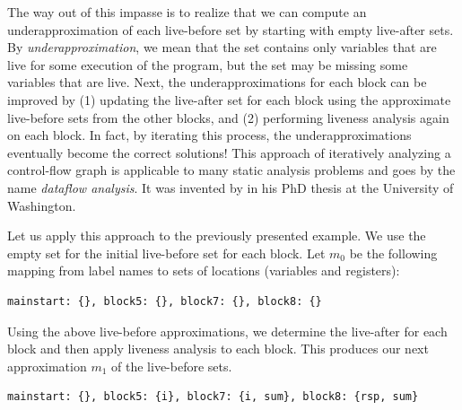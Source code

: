 \documentclass[7x10]{TimesAPriori_MIT}%
\numberwithin{theorem}{chapter}
\numberwithin{definition}{chapter}
\numberwithin{equation}{chapter}
\begin{document}
The way out of this impasse is to realize that we can compute an
underapproximation of each live-before set by starting with empty
live-after sets.  By \emph{underapproximation}, we mean that the set
contains only variables that are live for some execution of the
program, but the set may be missing some variables that are live.
Next, the underapproximations for each block can be improved by (1)
updating the live-after set for each block using the approximate
live-before sets from the other blocks, and (2) performing liveness
analysis again on each block.  In fact, by iterating this process, the
underapproximations eventually become the correct solutions!
%
This approach of iteratively analyzing a control-flow graph is
applicable to many static analysis problems and goes by the name
\emph{dataflow analysis}.  It was invented by
\citet{Kildall:1973vn} in his PhD thesis at the University of
Washington.

Let us apply this approach to the previously presented example. We use
the empty set for the initial live-before set for each block. Let
$m_0$ be the following mapping from label names to sets of locations
(variables and registers):
\begin{center}
\begin{lstlisting}
mainstart: {}, block5: {}, block7: {}, block8: {}
\end{lstlisting}
\end{center}
Using the above live-before approximations, we determine the
live-after for each block and then apply liveness analysis to each
block.  This produces our next approximation $m_1$ of the live-before
sets.
\begin{center}
  \begin{lstlisting}
mainstart: {}, block5: {i}, block7: {i, sum}, block8: {rsp, sum}
\end{lstlisting}
\end{center}
\end{document}
